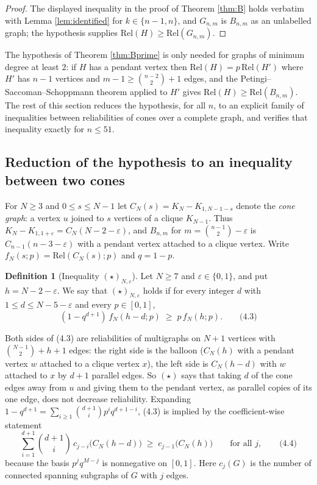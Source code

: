 \documentclass[
  11pt,
]{article}
\theoremstyle{definition}
\newtheorem{definition}[theorem]{Definition}
\theoremstyle{remark}
\begin{document}
\begin{proof}
The displayed inequality in the proof of Theorem \ref{thm:B} holds verbatim with Lemma \ref{lem:identified} for $k\in\{n-1,n\}$, and $G_{n,m}$ is $B_{n,m}$ as an unlabelled graph; the hypothesis supplies $\mathrm{Rel}(H)\ge\mathrm{Rel}(G_{n,m})$.
\end{proof}

The hypothesis of Theorem \ref{thm:Bprime} is only needed for graphs of
minimum degree at least \(2\): if \(H\) has a pendant vertex then
\(\mathrm{Rel}(H)=p\,\mathrm{Rel}(H')\) where \(H'\) has \(n-1\)
vertices and \(m-1\ge\binom{n-2}2+1\) edges, and the
Petingi--Saccoman--Schoppmann theorem applied to \(H'\) gives
\(\mathrm{Rel}(H)\ge\mathrm{Rel}(B_{n,m})\). The rest of this section
reduces the hypothesis, for all \(n\), to an explicit family of
inequalities between reliabilities of cones over a complete graph, and
verifies that inequality exactly for \(n\le 51\).

\subsection{Reduction of the hypothesis to an inequality between two
cones}\label{reduction-of-the-hypothesis-to-an-inequality-between-two-cones}

For \(N\ge3\) and \(0\le s\le N-1\) let \(C_N(s)=K_N-K_{1,N-1-s}\)
denote the \emph{cone graph}: a vertex \(u\) joined to \(s\) vertices of
a clique \(K_{N-1}\). Thus
\(K_{N}-K_{1,1+\varepsilon}=C_N(N-2-\varepsilon)\), and \(B_{n,m}\) for
\(m=\binom{n-1}2-\varepsilon\) is \(C_{n-1}(n-3-\varepsilon)\) with a
pendant vertex attached to a clique vertex. Write
\(f_N(s;p)=\mathrm{Rel}(C_N(s);p)\) and \(q=1-p\).

\begin{definition}[Inequality $(\star)_{N,\varepsilon}$]\label{def:star}
Let $N\ge 7$ and $\varepsilon\in\{0,1\}$, and put $h=N-2-\varepsilon$. We say that $(\star)_{N,\varepsilon}$ holds if for every integer $d$ with $1\le d\le N-5-\varepsilon$ and every $p\in[0,1]$,
$$(1-q^{d+1})\,f_N(h-d;p)\;\ge\;p\,f_N(h;p).\qquad\text{(4.3)}$$
\end{definition}

Both sides of (4.3) are reliabilities of multigraphs on \(N+1\) vertices
with \(\binom{N-1}2+h+1\) edges: the right side is the balloon
(\(C_N(h)\) with a pendant vertex \(w\) attached to a clique vertex
\(x\)), the left side is \(C_N(h-d)\) with \(w\) attached to \(x\) by
\(d+1\) parallel edges. So \((\star)\) says that taking \(d\) of the
cone edges away from \(u\) and giving them to the pendant vertex, as
parallel copies of its one edge, does not decrease reliability.
Expanding \(1-q^{d+1}=\sum_{i\ge1}\binom{d+1}i p^iq^{d+1-i}\), (4.3) is
implied by the coefficient-wise statement
\[\sum_{i=1}^{d+1}\binom{d+1}{i}\,c_{j-i}\bigl(C_N(h-d)\bigr)\;\ge\;c_{j-1}\bigl(C_N(h)\bigr)\qquad\text{for all }j,\qquad\text{(4.4)}\]
because the basis \(p^jq^{M-j}\) is nonnegative on \([0,1]\). Here
\(c_j(G)\) is the number of connected spanning subgraphs of \(G\) with
\(j\) edges.
\end{document}
